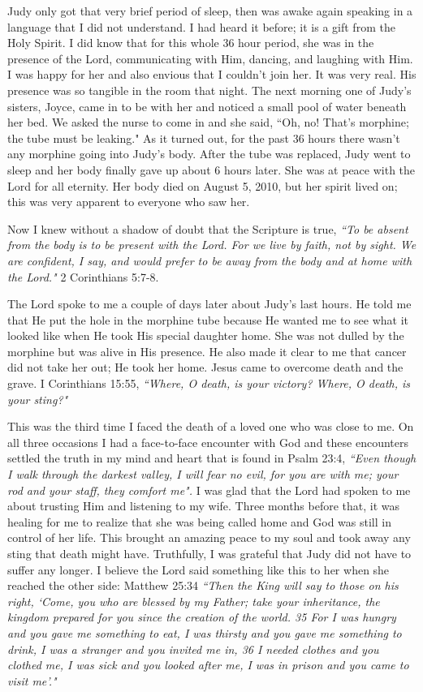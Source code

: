 \documentclass[oneside,12pt]{book}
\begin{document}
Judy only got that very  brief period of sleep, then was awake again speaking in a language that I did not understand. I had heard it before; it is a gift from the Holy Spirit. I did know that for this whole 36 hour period, she was in the presence of the Lord, communicating with Him, dancing, and laughing with Him. I was happy for her and also envious that I couldn't join her. It was very real. His presence was so tangible in the room that night. The next morning one of Judy's sisters, Joyce, came in to be with her and noticed a small pool of water beneath her bed. We asked the nurse to come in and she said, ``Oh, no! That's morphine; the tube must be leaking." As it turned out, for the past 36 hours there wasn't any morphine going into Judy's body. After the tube was replaced, Judy went to sleep and her body finally gave up about 6 hours later. She was at peace with the Lord for all eternity. Her body died on August 5, 2010, but her spirit lived on; this was very apparent to everyone who saw her.

Now I knew without a shadow of doubt that the Scripture is true, \textit{``To be absent from the body is to be present with the Lord. For we live by faith, not by sight. We are confident, I say, and would prefer to be away from the body and at home with the Lord."} 2 Corinthians 5:7-8.

The Lord spoke to me a couple of days later about Judy's last hours. He told me that He put the hole in the morphine tube because He wanted me to see what it looked like when He took His special daughter home. She was not dulled by the morphine but was alive in His presence. He also made it clear to me that cancer did not take her out; He took her home. Jesus came to overcome death and the grave. I Corinthians 15:55, \textit{``Where, O death, is your victory? Where, O death, is your sting?"}

This was the third time I faced the death of a loved one who was close to me. On all three occasions I had a face-to-face encounter with God and these encounters settled the truth in my mind and heart that is found in Psalm 23:4, \textit{``Even though I walk through the darkest valley, I will fear no evil, for you are with me; your rod and your staff, they comfort me".} I was glad that the Lord had spoken to me about trusting Him and listening to my wife. Three months before that, it was healing for me to realize that she was being called home and God was still in control of her life. This brought an amazing peace to my soul and took away any sting that death might have. Truthfully, I was grateful that Judy did not have to suffer any longer. I believe the Lord said something like this to her when she reached the other side:  Matthew 25:34 \textit{``Then the King will say to those on his right, `Come, you who are blessed by my Father; take your inheritance, the kingdom prepared for you since the creation of the world. 35 For I was hungry and you gave me something to eat, I was thirsty and you gave me something to drink, I was a stranger and you invited me in, 36 I needed clothes and you clothed me, I was sick and you looked after me, I was in prison and you came to visit me'."} 
\end{document}
